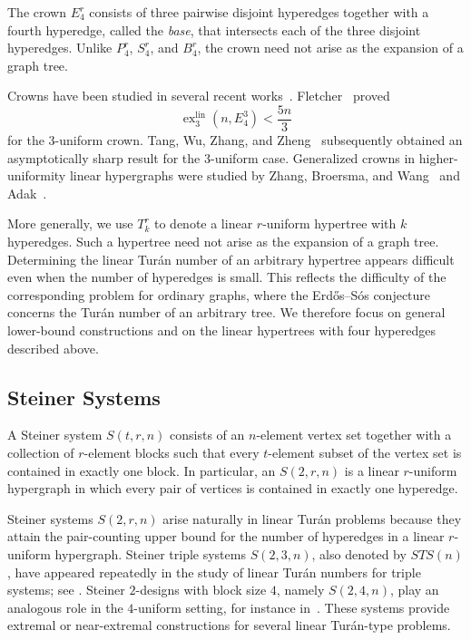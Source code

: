 \documentclass[11pt,a4paper]{article}
\theoremstyle{definition}
\theoremstyle{remark}
\begin{document}
The crown \(E_4^r\) consists of three pairwise disjoint hyperedges
together with a fourth hyperedge, called the \emph{base}, that
intersects each of the three disjoint hyperedges. Unlike
\(P_4^r\), \(S_4^r\), and \(B_4^r\), the crown need not arise as the
expansion of a graph tree.

Crowns have been studied in several recent
works~\cite{carbonero2021crowns,carbonero2022crowns,tang2022turan,zhang2025generalized}. Fletcher~\cite{fletcher2021improved} proved
$$
\operatorname{ex}^{\mathrm{lin}}_3(n,E_4^3)
<
\frac{5n}{3}
$$
for the \(3\)-uniform crown. Tang, Wu, Zhang, and
Zheng~\cite{tang2022turan} subsequently obtained an asymptotically
sharp result for the \(3\)-uniform case. Generalized crowns in
higher-uniformity linear hypergraphs were studied by Zhang, Broersma,
and Wang~\cite{zhang2025generalized} and Adak~\cite{adak2026upper}.

More generally, we use \(T_k^r\) to denote a linear \(r\)-uniform
hypertree with \(k\) hyperedges. Such a hypertree need not arise as the
expansion of a graph tree. Determining the linear Tur\'an number of an
arbitrary hypertree appears difficult even when the number of
hyperedges is small. This reflects the difficulty of the corresponding
problem for ordinary graphs, where the Erd\H{o}s--S\'os
conjecture~\cite{erdos1965extremal} concerns the Tur\'an number of an
arbitrary tree. We therefore focus on general lower-bound constructions
and on the linear hypertrees with four hyperedges described above.

\subsection{Steiner Systems}

A Steiner system \(S(t,r,n)\) consists of an \(n\)-element vertex set
together with a collection of \(r\)-element blocks such that every
\(t\)-element subset of the vertex set is contained in exactly one
block. In particular, an \(S(2,r,n)\) is a linear \(r\)-uniform
hypergraph in which every pair of vertices is contained in exactly one
hyperedge.

Steiner systems \(S(2,r,n)\) arise naturally in linear Tur\'an
problems because they attain the pair-counting upper bound for the
number of hyperedges in a linear \(r\)-uniform hypergraph. Steiner
triple systems \(S(2,3,n)\), also denoted by \(STS(n)\), have appeared
repeatedly in the study of linear Tur\'an numbers for triple systems;
see
\cite{gyarfas2022linear,gyarfas2021turan,gyarfas2022linearwicket,sarkozy2023turan}.
Steiner \(2\)-designs with block size \(4\), namely \(S(2,4,n)\),
play an analogous role in the \(4\)-uniform setting, for instance
in~\cite{zhang2025linear}. These systems provide extremal or
near-extremal constructions for several linear Tur\'an-type problems.
\end{document}
